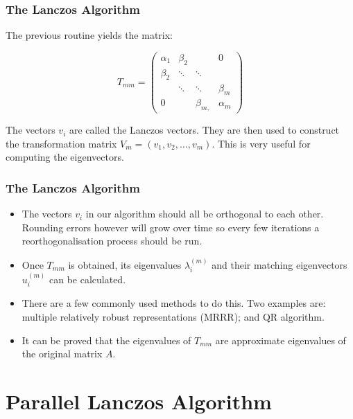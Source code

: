 \documentclass[pdf]{beamer}
\begin{document}
\begin{frame}
\frametitle{The Lanczos Algorithm}

The previous routine yields the matrix:

\[ T_{mm} = \left( \begin{array}{cccc}
\alpha_1 & \beta_{2} & & 0\\
\beta_{2} & \ddots &\ddots & \\
& \ddots & \ddots & \beta_{m} \\
0 & & \beta_{m,} & \alpha_m \end{array} \right) \]

The vectors $v_i$ are called the Lanczos vectors. They are then used to construct the transformation matrix $V_m=(v_1,v_2,\dots,v_m)$. This is very useful for computing the eigenvectors.

\end{frame}


\begin{frame}
\frametitle{The Lanczos Algorithm}
\begin{itemize}
\item The vectors $v_i$ in our algorithm should all be orthogonal to each other. Rounding errors however will grow over time so every few iterations a reorthogonalisation process should be run.
\item Once $T_{mm}$ is obtained, its eigenvalues $\lambda^{(m)}_i$ and their matching eigenvectors $u^{(m)}_i$ can be calculated.
\item There are a few commonly used methods to do this. Two examples are: multiple relatively robust representations (MRRR); and QR algorithm.

\item It can be proved that the eigenvalues of $T_{mm}$ are approximate eigenvalues of the original matrix $A$.
\end{itemize}

\end{frame}





\section{Parallel Lanczos Algorithm}

\begin{frame}
\tableofcontents[currentsection]
\end{frame}
\end{document}
